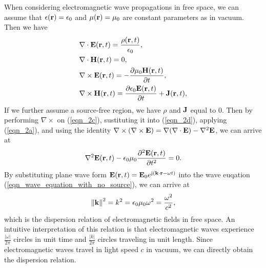 \documentclass[12pt,draftclsnofoot,journal,onecolumn]{IEEEtran}
\begin{document}
{When considering electromagnetic wave propagations in free space, we can assume that $\epsilon({\bf r}) = \epsilon_0$ and $\mu({\bf r}) = \mu_0$ are constant parameters as in vacuum. Then we have
\begin{subequations}
	\begin{align} 
		& \nabla \cdot  {\bf E}({\bf r},t) = \frac{\rho({\bf r},t)}{\epsilon_0}, \label{eqn_2a}\\
		& \nabla \cdot {\bf H}({\bf r},t) = 0,\\
		&\nabla \times {\bf E}({\bf r},t) = -\frac{\partial \mu_0 {\bf H}({\bf r},t)}{\partial t}, \label{eqn_2c}\\
		& \nabla \times {\bf H}({\bf r},t) = \frac{ \partial \epsilon_0 {\bf E}({\bf r},t)}{\partial t}+{\bf J}({\bf r},t) \label{eqn_2d}, 
	\end{align}
	\label{eqn_2}
\end{subequations}
If we further assume a source-free region, we have $\rho$ and ${\bf J}$ equal to 0. Then by performing $\nabla\times $ on (\ref{eqn_2c}), sustituting it into (\ref{eqn_2d}), applying (\ref{eqn_2a}), and using the identity $\nabla\times(\nabla\times {\bf E}) = \nabla(\nabla\cdot {\bf E})-\nabla^2 {\bf E}$, we can arrive at
\begin{equation}
	\begin{aligned}
		\nabla^2 {\bf E}({\bf r},t) - \epsilon_0 \mu_0 \frac{\partial^2 {\bf E}({\bf r},t)}{\partial t^2} = 0. 
	\end{aligned}
	\label{eqn_wave_equation_with_no_source}
\end{equation}
By substituting plane wave form ${\bf E}({\bf r},t) = {\bf E}_0 e^{{\rm j}({\bf k}\cdot {\bf r}-\omega t)}$ into the wave euqation (\ref{eqn_wave_equation_with_no_source}), we can arrive at
\begin{equation}
	\left\|  {\bf k} \right\|^2 = k^2 = \epsilon_0 \mu_0 \omega^2 = \frac{\omega^2}{c^2},
	\label{eqn_dispersion_relation}
\end{equation}
which is the dispersion relation of electromagnetic fields in free space. An intuitive interpretation of this relation is that electromagnetic waves experience $\frac{|\omega|}{2\pi}$ circles in unit time and $\frac{|k|}{2\pi}$ circles traveling in unit length. Since electromagnetic waves travel in light speed $c$ in vacuum, we can directly obtain the dispersion relation.

}
\end{document}
